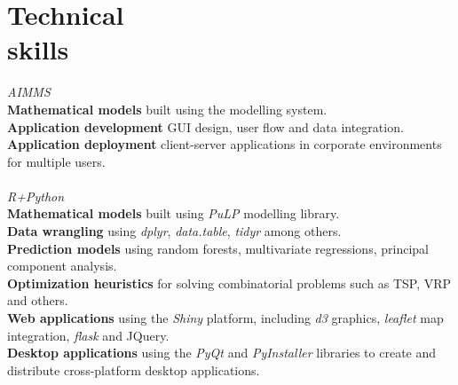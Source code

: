    			  
		\section{Technical \\ skills}

        \textsl{AIMMS}\\
					\hspace*{2ex}\textbf{Mathematical models} built using the modelling system.\\
					\hspace*{2ex}\textbf{Application development} GUI design, user flow and data integration.\\
					\hspace*{2ex}\textbf{Application deployment} client-server applications in corporate environments for multiple users.\\
        \\\textsl{R+Python}\\
					\hspace*{2ex}\textbf{Mathematical models} built using \textit{PuLP} modelling library.\\
					\hspace*{2ex}\textbf{Data wrangling} using \textit{dplyr}, \textit{data.table}, \textit{tidyr} among others.\\
					\hspace*{2ex}\textbf{Prediction models} using random forests, multivariate regressions, principal component analysis.\\
					\hspace*{2ex}\textbf{Optimization heuristics} for solving combinatorial problems such as TSP, VRP and others.\\
					\hspace*{2ex}\textbf{Web applications} using the \textit{Shiny} platform, including \textit{d3} graphics, \textit{leaflet} map integration, \textit{flask} and JQuery.\\
					\hspace*{2ex}\textbf{Desktop applications} using the \textit{PyQt} and \textit{PyInstaller} libraries to create and distribute cross-platform desktop applications.\\
